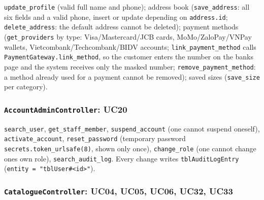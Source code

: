 \texttt{update\_\allowbreak{}profile} (valid full name and phone); address book
(\texttt{save\_\allowbreak{}address}: all six fields and a valid phone, insert or
update depending on \texttt{address.\allowbreak{}id}; \texttt{delete\_\allowbreak{}address}: the
default address cannot be deleted); payment methods
(\texttt{get\_\allowbreak{}providers} by type: Visa/Mastercard/JCB cards,
MoMo/ZaloPay/VNPay wallets, Vietcombank/Techcombank/BIDV accounts;
\texttt{link\_\allowbreak{}payment\_\allowbreak{}method} calls
\texttt{PaymentGateway.\allowbreak{}link\_\allowbreak{}method}, so the customer enters the number
on the bank\textquotesingle s page and the system receives only the
masked number; \texttt{remove\_\allowbreak{}payment\_\allowbreak{}method}: a method already used
for a payment cannot be removed); saved sizes (\texttt{save\_\allowbreak{}size} per
category).

\hypertarget{accountadmincontroller-uc20}{%
\subsubsection{\texorpdfstring{\texttt{AccountAdminController}:
UC20}{AccountAdminController: UC20}}\label{accountadmincontroller-uc20}}

\texttt{search\_\allowbreak{}user}, \texttt{get\_\allowbreak{}staff\_\allowbreak{}member},
\texttt{suspend\_\allowbreak{}account} (one cannot suspend oneself),
\texttt{activate\_\allowbreak{}account}, \texttt{reset\_\allowbreak{}password} (temporary password
\texttt{secrets.\allowbreak{}token\_\allowbreak{}urlsafe(\allowbreak{}8)}, shown only once),
\texttt{change\_\allowbreak{}role} (one cannot change one\textquotesingle s own
role), \texttt{search\_\allowbreak{}audit\_\allowbreak{}log}. Every change writes
\texttt{tblAuditLogEntry}
(\texttt{entity =\allowbreak{} "tblUser\#\textless{}id\textgreater{}\allowbreak{}"}).

\hypertarget{cataloguecontroller-uc04-uc05-uc06-uc32-uc33}{%
\subsubsection{\texorpdfstring{\texttt{CatalogueController}: UC04, UC05,
UC06, UC32,
UC33}{CatalogueController: UC04, UC05, UC06, UC32, UC33}}\label{cataloguecontroller-uc04-uc05-uc06-uc32-uc33}}

